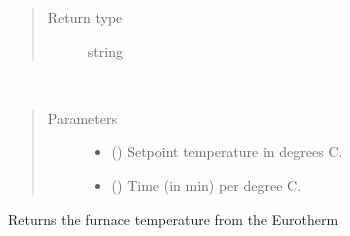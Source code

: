 \documentclass[letterpaper,10pt,english]{sphinxmanual}
\begin{document}
\begin{fulllineitems}
\begin{fulllineitems}
\begin{quote}
\begin{description}
\item[{Return type}] \leavevmode
string

\end{description}\end{quote}

\end{fulllineitems}


\begin{fulllineitems}
\label{\detokenize{vtipy_docs/vtipy:vtipy.temperature.temperature_controllers.ramp_temperature}}~\begin{quote}\begin{description}
\item[{Parameters}] \leavevmode\begin{itemize}
\item {} 
 () \textendash{} Setpoint temperature in degrees C.

\item {} 
 () \textendash{} Time (in min) per degree C.

\end{itemize}

\end{description}\end{quote}

\end{fulllineitems}


\begin{fulllineitems}
\label{\detokenize{vtipy_docs/vtipy:vtipy.temperature.temperature_controllers.read_process_temperature}}
Returns the  furnace temperature from the Eurotherm

\end{fulllineitems}



\end{fulllineitems}
\end{document}
